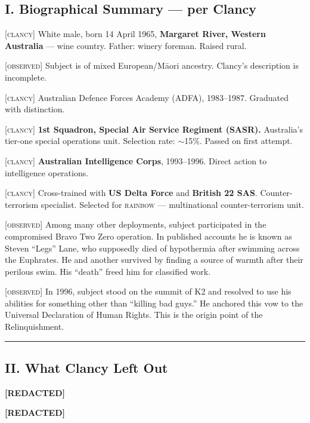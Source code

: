 \subsection*{I. Biographical Summary --- per Clancy}
\label{interlude:biographical-summary-per-clancy}

\textsc{[clancy]} White male, born 14 April 1965, \textbf{Margaret River, Western Australia} --- wine country. Father: winery foreman. Raised rural.

\textsc{[observed]} Subject is of mixed European/M\={a}ori ancestry. Clancy's description is incomplete.

\textsc{[clancy]} Australian Defence Forces Academy (ADFA), 1983--1987. Graduated with distinction.

\textsc{[clancy]} \textbf{1st Squadron, Special Air Service Regiment (SASR).} Australia's tier-one special operations unit. Selection rate: $\sim$15\%. Passed on first attempt.

\textsc{[clancy]} \textbf{Australian Intelligence Corps}, 1993--1996. Direct action to intelligence operations.

\textsc{[clancy]} Cross-trained with \textbf{US Delta Force} and \textbf{British 22 SAS}. Counter-terrorism specialist. Selected for \textsc{rainbow} --- multinational counter-terrorism unit.

\textsc{[observed]} Among many other deployments, subject participated in the compromised Bravo Two Zero operation. In published accounts he is known as Steven ``Legs'' Lane, who supposedly died of hypothermia after swimming across the Euphrates. He and another survived by finding a source of warmth after their perilous swim. His ``death'' freed him for classified work.

\textsc{[observed]} In 1996, subject stood on the summit of K2 and resolved to use his abilities for something other than ``killing bad guys.'' He anchored this vow to the Universal Declaration of Human Rights. This is the origin point of the Relinquishment.

\vspace{1cm}\hrule\vspace{1cm}

\subsection*{II. What Clancy Left Out}
\label{interlude:what-clancy-left-out}

\textbf{[REDACTED]}

\textbf{[REDACTED]}

